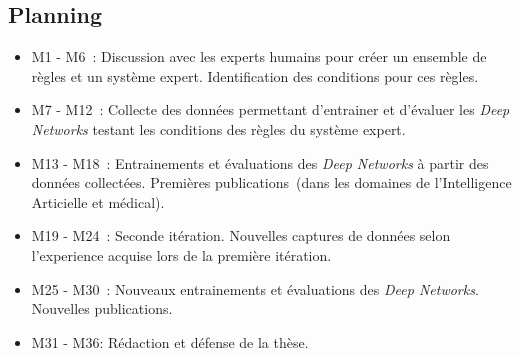 \documentclass[11pt]{article}
\begin{document}
\subsection{Planning}
\label{sec:org8a30be3}
\begin{itemize}
\item M1 - M6~: Discussion avec les experts humains pour cr\'eer un
  ensemble de r\`egles et un syst\`eme expert. Identification des
  conditions pour ces r\`egles.
\item M7 - M12~: Collecte des donn\'ees permettant d'entrainer et
  d'\'evaluer les \emph{Deep Networks} testant les conditions des
  r\`egles du syst\`eme expert. 
\item M13 - M18~: Entrainements et \'evaluations des \emph{Deep
  Networks} \`a partir des donn\'ees collect\'ees. Premi\`eres
  publications~(dans les domaines de l'Intelligence Articielle et m\'edical).
\item M19 - M24~: Seconde it\'eration. Nouvelles captures de donn\'ees
  selon l'experience acquise lors de la premi\`ere it\'eration.
\item M25 - M30~: Nouveaux entrainements et \'evaluations  des \emph{Deep
  Networks}. Nouvelles publications. 
\item M31 - M36: R\'edaction et d\'efense de la th\`ese.
\end{itemize}





\end{document}
